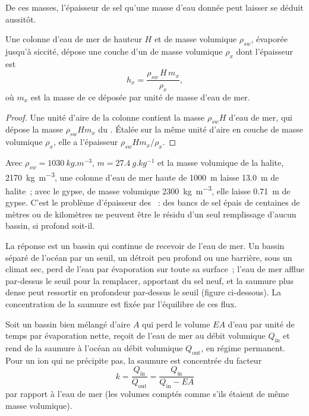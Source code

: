 De ces masses, l'épaisseur de sel qu'une masse d'eau donnée peut laisser
se déduit aussitôt.

\begin{proposition}\label{prop:b1:chemical-biogenic-sediments:column}
Une colonne d'eau de mer de hauteur $H$ et de masse volumique $\rho_{sw}$, évaporée jusqu'à
siccité, dépose une couche d'un  de masse volumique $\rho_x$ dont l'épaisseur est
\[
h_x = \frac{\rho_{sw}\,H\,m_x}{\rho_x},
\]
où $m_x$ est la masse de ce  déposée par unité de masse d'eau de mer.
\end{proposition}

\begin{proof}
Une unité d'aire de la colonne contient la masse $\rho_{sw}H$ d'eau de mer, qui dépose
la masse $\rho_{sw}Hm_x$ du . Étalée sur la même unité d'aire en
couche de masse volumique $\rho_x$, elle a l'épaisseur $\rho_{sw}Hm_x/\rho_x$.
\end{proof}

Avec $\rho_{sw} = \qty{1030}{kg.m^{-3}}$, $m = \qty{27.4}{g.kg^{-1}}$ et la
masse volumique de la halite, \qty{2170}{kg.m^{-3}}, une colonne d'eau de mer haute de \qty{1000}{m}
laisse \qty{13.0}{m} de halite~; avec le gypse, de masse volumique \qty{2300}{kg.m^{-3}}, elle
laisse \qty{0.71}{m} de gypse. C'est le problème d'épaisseur des ~:
des bancs de sel épais de centaines de mètres ou de kilomètres ne peuvent être le résidu d'un
seul remplissage d'aucun bassin, si profond soit-il.

La réponse est un bassin qui continue de recevoir de l'eau de mer. Un bassin séparé de
l'océan par un seuil, un détroit peu profond ou une barrière, sous un climat sec, perd de l'eau par
évaporation sur toute sa surface~; l'eau de mer afflue par-dessus le seuil pour la remplacer,
apportant du sel neuf, et la saumure plus dense peut ressortir en profondeur par-dessus le seuil
(figure ci-dessous). La concentration de la saumure
est fixée par l'équilibre de ces flux.

\begin{proposition}\label{prop:b1:chemical-biogenic-sediments:barred}
Soit un bassin bien mélangé d'aire $A$ qui perd le volume $EA$ d'eau par unité de temps
par évaporation nette, reçoit de l'eau de mer au débit volumique $Q_{\mathrm{in}}$ et
rend de la saumure à l'océan au débit volumique $Q_{\mathrm{out}}$, en régime
permanent. Pour un ion qui ne précipite pas, la saumure est concentrée du
facteur
\[
k = \frac{Q_{\mathrm{in}}}{Q_{\mathrm{out}}} = \frac{Q_{\mathrm{in}}}{Q_{\mathrm{in}} - EA}
\]
par rapport à l'eau de mer (les volumes comptés comme s'ils étaient de même masse volumique).
\end{proposition}

